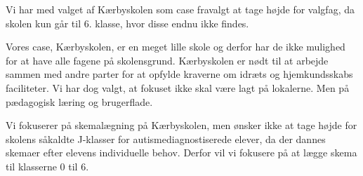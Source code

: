 Vi har med valget af Kærbyskolen som case fravalgt at tage højde for valgfag, da skolen kun går til 6. klasse, hvor disse endnu ikke findes. 

Vores case, Kærbyskolen, er en meget lille skole og derfor  har de ikke mulighed for at have alle fagene på skolensgrund. Kærbyskolen er nødt til at arbejde sammen med andre parter for at opfylde kraverne om idræts og hjemkundsskabs faciliteter. Vi har dog valgt, at fokuset ikke skal være lagt på lokalerne. Men på pædagogisk læring og brugerflade.

Vi fokuserer på skemalægning på Kærbyskolen, men ønsker ikke at tage højde for skolens såkaldte J-klasser for autismediagnostiserede elever, da der dannes skemaer efter elevens individuelle behov. Derfor vil vi fokusere på at lægge skema til klasserne 0 til 6.



